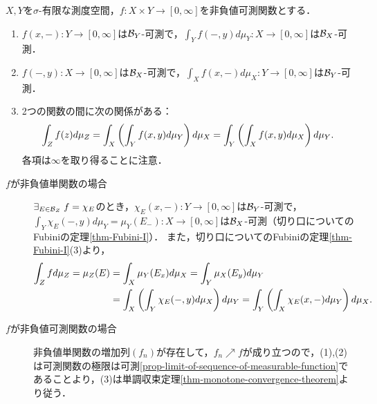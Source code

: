 \documentclass[uplatex, dvipdfmx]{jsreport}
\begin{document}
\begin{theorem}\label{thm-Fubini-II}
    $X,Y$を$\sigma$-有限な測度空間，$f:X\times Y\to[0,\infty]$を非負値可測関数とする．
    \begin{enumerate}
        \item $f(x,-):Y\to[0,\infty]$は$\mathcal{B}_Y$-可測で，$\int_Yf(-,y)d\mu_Y:X\to[0,\infty]$は$\mathcal{B}_X$-可測．
        \item $f(-,y):X\to[0,\infty]$は$\mathcal{B}_X$-可測で，$\int_Xf(x,-)d\mu_X:Y\to[0,\infty]$は$\mathcal{B}_Y$-可測．
        \item 2つの関数の間に次の関係がある：
        \[\int_{Z}f(z)d\mu_Z=\int_X\left(\int_Yf(x,y)d\mu_Y\right)d\mu_X=\int_Y\left(\int_Xf(x,y)d\mu_X\right)d\mu_Y.\]
        各項は$\infty$を取り得ることに注意．
    \end{enumerate}
\end{theorem}
\begin{Proof}\mbox{}
    \begin{description}
        \item[$f$が非負値単関数の場合] $\exists_{E\in\mathcal{B}_Z}\;f=\chi_E$のとき，$\chi_E(x,-):Y\to[0,\infty]$は$\mathcal{B}_Y$-可測で，$\int_Y\chi_E(-,y)d\mu_Y=\mu_Y(E_-):X\to[0,\infty]$は$\mathcal{B}_X$-可測（切り口についてのFubiniの定理\ref{thm-Fubini-I}）．
        また，切り口についてのFubiniの定理\ref{thm-Fubini-I}(3)より，
        \begin{align*}
            \int_Zfd\mu_Z=\mu_Z(E)&=\int_X\mu_Y(E_x)d\mu_X=\int_Y\mu_X(E_y)d\mu_Y\\
            &=\int_X\left(\int_Y\chi_E(-,y)d\mu_X\right)d\mu_Y=\int_Y\left(\int_X\chi_E(x,-)d\mu_Y\right)d\mu_X.
        \end{align*}
        \item[$f$が非負値可測関数の場合] 
        非負値単関数の増加列$(f_n)$が存在して，$f_n\nearrow f$が成り立つので，(1),(2)は可測関数の極限は可測\ref{prop-limit-of-sequence-of-measurable-function}であることより，(3)は単調収束定理\ref{thm-monotone-convergence-theorem}より従う．
    \end{description}
\end{Proof}
\end{document}
